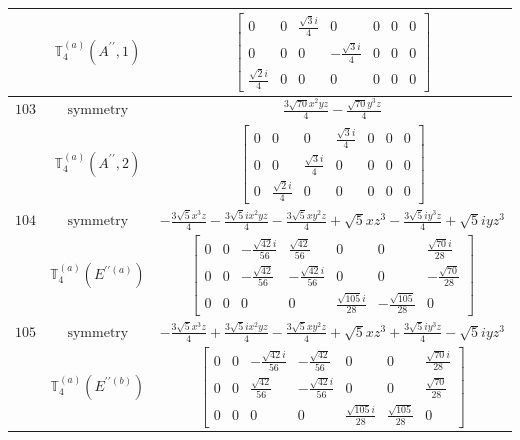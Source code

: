 \documentclass[fleqn,8pt,landscape]{jsarticle}
\begin{document}
\begin{longtable}{ccc}
$  $ & $ \mathbb{T}_{4}^{(a)}(A^{\prime\prime},1) $ & $ \begin{bmatrix} 0 & 0 & \frac{\sqrt{3} i}{4} & 0 & 0 & 0 & 0 \\ 0 & 0 & 0 & - \frac{\sqrt{3} i}{4} & 0 & 0 & 0 \\ \frac{\sqrt{2} i}{4} & 0 & 0 & 0 & 0 & 0 & 0 \end{bmatrix} $ \\ \hline
$ 103 $ & $ \text{symmetry} $ & $ \frac{3 \sqrt{70} x^{2} y z}{4} - \frac{\sqrt{70} y^{3} z}{4} $ \\
$  $ & $ \mathbb{T}_{4}^{(a)}(A^{\prime\prime},2) $ & $ \begin{bmatrix} 0 & 0 & 0 & \frac{\sqrt{3} i}{4} & 0 & 0 & 0 \\ 0 & 0 & \frac{\sqrt{3} i}{4} & 0 & 0 & 0 & 0 \\ 0 & \frac{\sqrt{2} i}{4} & 0 & 0 & 0 & 0 & 0 \end{bmatrix} $ \\ \hline
$ 104 $ & $ \text{symmetry} $ & $ - \frac{3 \sqrt{5} x^{3} z}{4} - \frac{3 \sqrt{5} i x^{2} y z}{4} - \frac{3 \sqrt{5} x y^{2} z}{4} + \sqrt{5} x z^{3} - \frac{3 \sqrt{5} i y^{3} z}{4} + \sqrt{5} i y z^{3} $ \\
$  $ & $ \mathbb{T}_{4}^{(a)}(E^{\prime\prime(a)}) $ & $ \begin{bmatrix} 0 & 0 & - \frac{\sqrt{42} i}{56} & \frac{\sqrt{42}}{56} & 0 & 0 & \frac{\sqrt{70} i}{28} \\ 0 & 0 & - \frac{\sqrt{42}}{56} & - \frac{\sqrt{42} i}{56} & 0 & 0 & - \frac{\sqrt{70}}{28} \\ 0 & 0 & 0 & 0 & \frac{\sqrt{105} i}{28} & - \frac{\sqrt{105}}{28} & 0 \end{bmatrix} $ \\ \hline
$ 105 $ & $ \text{symmetry} $ & $ - \frac{3 \sqrt{5} x^{3} z}{4} + \frac{3 \sqrt{5} i x^{2} y z}{4} - \frac{3 \sqrt{5} x y^{2} z}{4} + \sqrt{5} x z^{3} + \frac{3 \sqrt{5} i y^{3} z}{4} - \sqrt{5} i y z^{3} $ \\
$  $ & $ \mathbb{T}_{4}^{(a)}(E^{\prime\prime(b)}) $ & $ \begin{bmatrix} 0 & 0 & - \frac{\sqrt{42} i}{56} & - \frac{\sqrt{42}}{56} & 0 & 0 & \frac{\sqrt{70} i}{28} \\ 0 & 0 & \frac{\sqrt{42}}{56} & - \frac{\sqrt{42} i}{56} & 0 & 0 & \frac{\sqrt{70}}{28} \\ 0 & 0 & 0 & 0 & \frac{\sqrt{105} i}{28} & \frac{\sqrt{105}}{28} & 0 \end{bmatrix} $ \\ \hline

\end{longtable}
\end{document}
